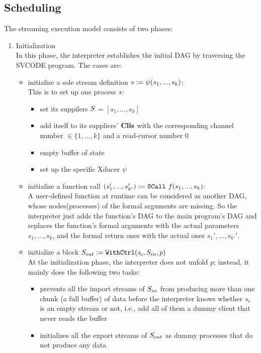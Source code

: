 \subsection{Scheduling}
The streaming execution model consists of two phases:
\begin{enumerate}[(1)]
\item Initialization \\
In this phase, the interpreter establishes the initial DAG by traversing the SVCODE program. The cases are:
\begin{itemize}
	\item initialize a sole stream definition $\sdef{s}{\lcall(s_1,...,s_k)}$: \\
	This is to set up one process $\s$:
	\begin{itemize}
		\item set its suppilers $\S$ = $[s_1,...,s_k]$
		\item add itself to its suppliers' $\clis$ with the corresponding channel number $\in \{1,...,k\}$ and a read-cursor number 0
		\item empty buffer of state {\filling}
		\item set up the specific Xducer $\lcall$
	\end{itemize}

	
	\item initialize a function call  $\scall{f}{s_1,...,s_k}{(s_1',...,s'_{k'})}$: \\
	A user-defined function at runtime can be considered as another DAG, whose nodes(processes) of the formal arguments are missing. 
	So the interpreter just adds the function's DAG to the main program's DAG 
	and replaces the function's formal arguments with the actual parameters $s_1,...,s_k$, and the formal return ones with the actual ones $s_1',...,s_{k'}'$.  

	
	\item initialize a \wc block $\withctrl{\s_c}{p}{\Sin}{\Sout}$ \\
	At the initialization phase, the interpreter does not unfold $p$; instead, it mainly does the following two tasks:	
	\begin{itemize}
		\item prevents all the import streams of $\Sin$ from producing more than one chunk (a full buffer) of data before the interpreter knows whether $s_c$ is an empty stream or not, i.e., add all of them a dummy client that never reads the buffer 
		\item initializes all the export streams of $\Sout$ as dummy processes that do not produce any data
	\end{itemize}


\end{itemize}
\end{enumerate}
